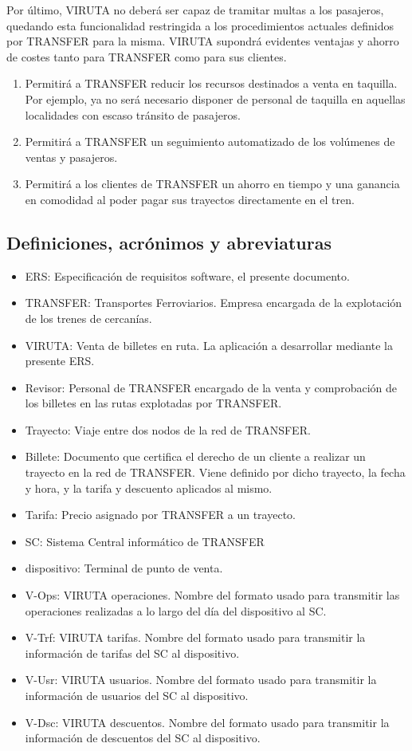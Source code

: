 Por último, VIRUTA no deberá ser capaz de tramitar multas a los pasajeros, quedando esta funcionalidad restringida a los procedimientos actuales definidos por TRANSFER para la misma.
VIRUTA supondrá evidentes ventajas y ahorro de costes tanto para TRANSFER como para sus clientes.\\

\begin{enumerate}
\item Permitirá a TRANSFER reducir los recursos destinados a venta en taquilla. Por ejemplo, ya no será necesario disponer de personal de taquilla en aquellas localidades con escaso tránsito de pasajeros.
\item Permitirá a TRANSFER un seguimiento automatizado de los volúmenes de ventas y pasajeros.
\item Permitirá a los clientes de TRANSFER un ahorro en tiempo y una ganancia en comodidad al poder pagar sus trayectos directamente en el tren.
\end{enumerate}

\subsection{Definiciones, acrónimos y abreviaturas}

\begin{itemize}
\item ERS: Especificación de requisitos software, el presente documento.
\item TRANSFER: Transportes Ferroviarios. Empresa encargada de la explotación de los trenes de cercanías.
\item VIRUTA: Venta de billetes en ruta. La aplicación a desarrollar mediante la presente ERS.
\item Revisor: Personal de TRANSFER encargado de la venta y comprobación de los billetes en las rutas explotadas por TRANSFER.
\item Trayecto: Viaje entre dos nodos de la red de TRANSFER.
\item Billete: Documento que certifica el derecho de un cliente a realizar un trayecto en la red de TRANSFER. Viene definido por dicho trayecto, la fecha y hora, y la tarifa y descuento aplicados al mismo.
\item Tarifa: Precio asignado por TRANSFER a un trayecto.
\item SC: Sistema Central informático de TRANSFER
\item dispositivo: Terminal de punto de venta.
\item V-Ops: VIRUTA operaciones. Nombre del formato usado para transmitir las operaciones realizadas a lo largo del día del dispositivo al SC.
\item V-Trf: VIRUTA tarifas. Nombre del formato usado para transmitir la información de tarifas del SC al dispositivo.
\item V-Usr: VIRUTA usuarios. Nombre del formato usado para transmitir la información de usuarios del SC al dispositivo.
\item V-Dsc: VIRUTA descuentos. Nombre del formato usado para transmitir la información de descuentos del SC al dispositivo.

\end{itemize}

